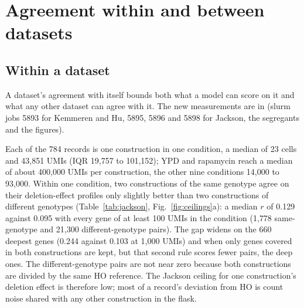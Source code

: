 
\section{Agreement within and between datasets}
\label{sec:agreement}

\subsection{Within a dataset}
\label{sec:within}

A dataset's agreement with itself bounds both what a model can score on it and what
any other dataset can agree with it. The new measurements are in
(slurm jobs 5893 for Kemmeren and Hu, 5895, 5896 and 5898 for Jackson, the segregants and the figures).

Each of the 784 records is one construction in one condition, a median of 23
cells and 43{,}851 UMIs (IQR 19{,}757 to 101{,}152); YPD and rapamycin reach a median of about 400{,}000
UMIs per construction, the other nine conditions 14{,}000 to 93{,}000. Within one condition, two constructions of the same
genotype agree on their deletion-effect profiles only slightly better than two
constructions of different genotypes (Table~\ref{tab:jackson},
Fig.~\ref{fig:ceilings}a): a median $r$ of 0.129 against 0.095 with every gene of at
least 100 UMIs in the condition (1{,}778 same-genotype and 21{,}300 different-genotype
pairs). The gap widens on the 660 deepest genes (0.244 against 0.103 at 1{,}000 UMIs)
and when only genes covered in both constructions are kept, but that second rule scores
fewer pairs, the deep ones. The different-genotype pairs are not near zero because both
constructions are divided by the same HO reference. The Jackson ceiling for one
construction's deletion effect is therefore low; most of a record's deviation from HO is
count noise shared with any other construction in the flask.

\begin{table}[htbp]
\centering
\scriptsize
\setlength{\tabcolsep}{3pt}
\caption[]{\textbf{Jackson 2020, construction against construction within one
condition.} Pooled over the 11 conditions. Level profile: Pearson over genes of
$\log_2(\mathrm{CPM}+1)$; deletion effect: of $\log_2((\mathrm{CPM}+1)/
(\mathrm{CPM}_{\mathrm{HO}}+1))$ against the six HO constructions summed, HO pairs left
out. A gene enters every pair of a condition when its UMIs summed over that condition
reach the floor. Same genotype: two of the six constructions of one genotype; different:
two constructions of different genotypes in the same flask.}
\label{tab:jackson}

\end{table}

